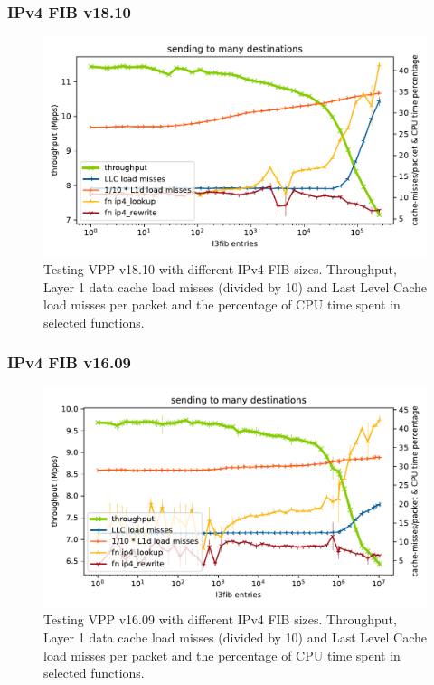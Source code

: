 \begin{frame}
    \frametitle{IPv4 FIB v18.10}
    \begin{figure}[!ht]
    \noindent\hspace{0.5mm}\includegraphics[width=\linewidth]{pics/throughput_l3_routes_klaipeda32ghz_v3.pdf}
    \caption{Testing VPP v18.10 with different IPv4 FIB sizes. Throughput, Layer 1 data cache load misses (divided by 10) and Last Level Cache load misses per packet and the percentage of CPU time spent in selected functions.}
    \label{graph:ip4fib}
    \end{figure}
\end{frame}

\begin{frame}
    \frametitle{IPv4 FIB v16.09}
    \begin{figure}[!ht]
    \noindent\hspace{0.5mm}\includegraphics[width=\linewidth]{pics/throughput_l3_routes_klaipeda_v1609_32ghz_v3.pdf}
    \caption{Testing VPP v16.09 with different IPv4 FIB sizes. Throughput, Layer 1 data cache load misses (divided by 10) and Last Level Cache load misses per packet and the percentage of CPU time spent in selected functions. }
    \label{graph:ip4fiblegacy}
    \end{figure}
\end{frame}

